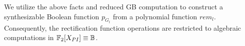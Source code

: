 We utilize the above facts and reduced GB computation to 
construct a synthesizable Boolean function $p_{G_l}$ from a polynomial function $rem_l$.
Consequently, the rectification function operations are restricted to
algebraic computations in ${\mathbb{F}}_2[X_{PI}]\equiv {\mathbb{B}}$. 

